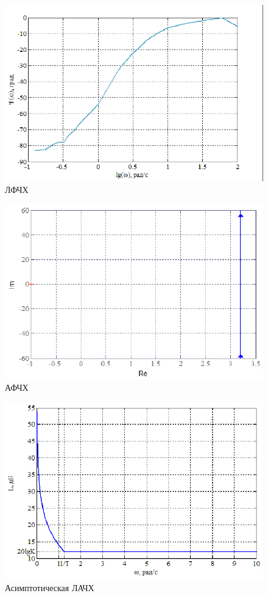 \documentclass[a4paper,12pt]{article} %
\begin{document}
\begin{figure}[H]
	\centering
	\includegraphics[width=1\linewidth]{scheme/Lfch3.eps}
	\caption{ЛФЧХ}
\end{figure}
\begin{figure}[H]
	\centering
	\includegraphics[width=1\linewidth]{scheme/Afch3.eps}
	\caption{АФЧХ}
\end{figure}
\begin{figure}[H]
	\centering
	\includegraphics[width=1\linewidth]{scheme/Asi3.eps}
	\caption{Асимптотическая ЛАЧХ}
\end{figure}
\end{document}
